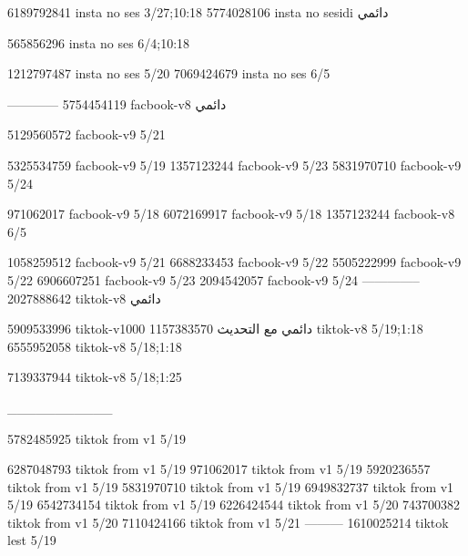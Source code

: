 
6189792841 insta no ses
3/27;10:18
5774028106 insta no sesidi
دائمي


565856296 insta no ses
6/4;10:18


1212797487 insta no ses
5/20
7069424679 insta no ses
6/5

------------
5754454119 facbook-v8
دائمي

5129560572 facbook-v9
5/21

5325534759 facbook-v9
5/19
1357123244 facbook-v9
5/23
5831970710 facbook-v9
5/24

971062017 facbook-v9
5/18
6072169917 facbook-v9
5/18
1357123244 facbook-v8
6/5

1058259512 facbook-v9
5/21
6688233453 facbook-v9
5/22
5505222999 facbook-v9
5/22
6906607251 facbook-v9
5/23
2094542057 facbook-v9
5/24
--------------
2027888642 tiktok-v8
دائمي

5909533996 tiktok-v1000
دائمي مع التحديث
1157383570 tiktok-v8
5/19;1:18
6555952058 tiktok-v8
5/18;1:18

7139337944 tiktok-v8
5/18;1:25

___________

5782485925 tiktok from v1
5/19

6287048793 tiktok from v1
5/19
971062017 tiktok from v1
5/19
5920236557 tiktok from v1
5/19
5831970710 tiktok from v1
5/19
6949832737 tiktok from v1
5/19
6542734154 tiktok from v1
5/19
6226424544 tiktok from v1
5/20
743700382 tiktok from v1
5/20
7110424166 tiktok from v1
5/21
---------
1610025214 tiktok lest
5/19
